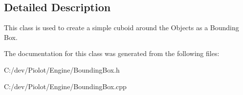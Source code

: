 \subsection{Detailed Description}
This class is used to create a simple cuboid around the Objects as a Bounding Box. 

The documentation for this class was generated from the following files\+:\begin{DoxyCompactItemize}
\item 
C\+:/dev/\+Piolot/\+Engine/Bounding\+Box.\+h\item 
C\+:/dev/\+Piolot/\+Engine/Bounding\+Box.\+cpp\end{DoxyCompactItemize}
